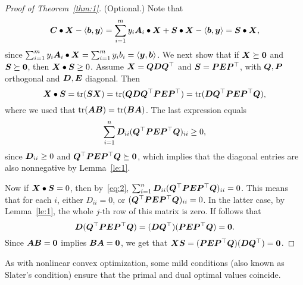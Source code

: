 \begin{proof}[Proof of Theorem~\ref{thm:1}](Optional.)
Note that
\begin{equation*}
 \bm{C}\bullet\bm{X}-\langle {\bm{b}}, {\bm{y}} \rangle=\sum_{i=1}^m y_i \bm{A}_i\bullet \bm{X}+\bm{S}\bullet \bm{X}-\langle {\bm{b}}, {\bm{y}} \rangle = \bm{S}\bullet \bm{X},
\end{equation*}
since $\sum_{i=1}^m y_i \bm{A}_i\bullet \bm{X}=\sum_{i=1}^m y_ib_i=\langle {\bm{y}}, {\bm{b}} \rangle$.
 We next show that if $\bm{X}\succeq \bm{0}$ and $\bm{S}\succeq \bm{0}$, then $\bm{X}\bullet \bm{S}\geq 0$. Assume $\bm{X}=\bm{Q}\bm{D}\bm{Q}^{\top}$ and $\bm{S}=\bm{P}\bm{E}\bm{P}^{\top}$, with $\bm{Q},\bm{P}$ orthogonal and $\bm{D},\bm{E}$ diagonal. Then
 \begin{equation*}
  \bm{X}\bullet \bm{S} = \mathrm{tr}(\bm{S}\bm{X}) = \mathrm{tr}(\bm{Q}\bm{D}\bm{Q}^{\top}\bm{P}\bm{E}\bm{P}^{\top}) = \mathrm{tr}(\bm{D}\bm{Q}^{\top}\bm{PE}\bm{P}^{\top}\bm{Q}),
 \end{equation*}
where we used that $\mathrm{tr}(\bm{A}\bm{B})=\mathrm{tr}(\bm{B}\bm{A})$. The last expression equals 
\begin{equation}\label{eq:2}
 \sum_{i=1}^n \bm{D}_{ii} (\bm{Q}^{\top}\bm{PE}\bm{P}^{\top}\bm{Q})_{ii}\geq 0,
\end{equation}
since $\bm{D}_{ii}\geq 0$ and $\bm{Q}^{\top}\bm{PE}\bm{P}^{\top}\bm{Q}\succeq \bm{0}$, which implies that the diagonal entries are also nonnegative by Lemma~\ref{le:1}.

Now if $\bm{X}\bullet \bm{S}=0$, then by~\eqref{eq:2}, $\sum_{i=1}^n \bm{D}_{ii} (\bm{Q}^{\top}\bm{PE}\bm{P}^{\top}\bm{Q})_{ii}=0$. This means that for each $i$, either $D_{ii}=0$, or $(\bm{Q}^{\top}\bm{PE}\bm{P}^{\top}\bm{Q})_{ii}=0$. In the latter case, by Lemma~\ref{le:1}, the whole $j$-th row of this matrix is zero. If follows that
\begin{equation*}
 \bm{D}(\bm{Q}^{\top}\bm{PE}\bm{P}^{\top}\bm{Q})=(\bm{D}\bm{Q}^{\top})(\bm{PE}\bm{P}^{\top}\bm{Q})=\bm{0}.
\end{equation*}
Since $\bm{A}\bm{B}=\bm{0}$ implies $\bm{B}\bm{A}=\bm{0}$, we get that $\bm{X}\bm{S}=(\bm{PE}\bm{P}^{\top}\bm{Q})(\bm{D}\bm{Q}^{\top})=\bm{0}$.
\end{proof}

As with nonlinear convex optimization, some mild conditions (also known as Slater's condition) ensure that the primal and dual optimal values coincide. 

